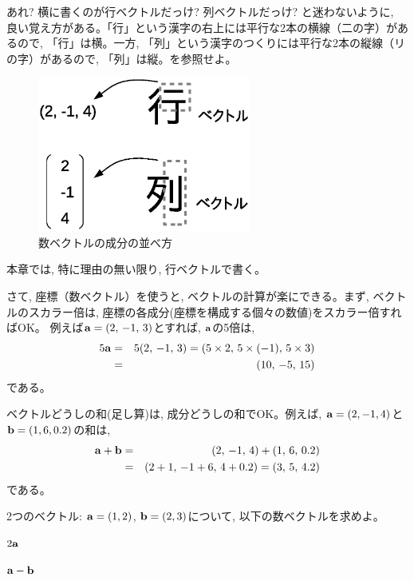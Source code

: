 あれ? 横に書くのが行ベクトルだっけ? 列ベクトルだっけ? と迷わないように, 
良い覚え方がある。「行」という漢字の右上には平行な2本の横線（二の字）があるので, 
「行」は横。一方, 「列」という漢字のつくりには平行な2本の縦線（リの字）があるので, 
「列」は縦。を参照せよ。
\begin{figure}
    \centering
    \includegraphics[width=7cm]{row_col.eps}
    \caption{数ベクトルの成分の並べ方\label{fig:row_col}}
\end{figure}
\hv

本章では, 特に理由の無い限り, 行ベクトルで書く。

さて, 座標（数ベクトル）を使うと, ベクトルの計算が楽にできる。まず, ベクトルのスカラー倍は, 
座標の各成分(座標を構成する個々の数値)をスカラー倍すればOK。
例えば${\bf a}=(2,\, -1,\, 3)$とすれば, ${\bf a}$の5倍は, 
\begin{eqnarray}
5{\bf a}&=&5(2,\, -1,\, 3)=(5\times2,\, 5\times(-1),\, 5\times3)\nonumber\\
        &=&(10,\, -5,\, 15)
\end{eqnarray}
である。

ベクトルどうしの和(足し算)は, 成分どうしの和でOK。例えば, 
${\bf a}=(2, -1, 4)$と${\bf b}=(1, 6, 0.2)$の和は, 
\begin{eqnarray*}
{\bf a}+{\bf b}&=&(2,\, -1,\, 4)+(1,\, 6,\, 0.2)\\
               &=&(2+1,\, -1+6,\, 4+0.2)
               =(3,\, 5,\, 4.2)
\end{eqnarray*}
である。\hv

\begin{q}\label{q:vect_2D_calc0} 2つのベクトル: ${\bf a}=(1,2)$, ${\bf b}=(2,3)$について, 
以下の数ベクトルを求めよ。
\begin{edaenumerate}
\item $2{\bf a}$
\item ${\bf a}-{\bf b}$
\end{edaenumerate}\end{q}
\hv

